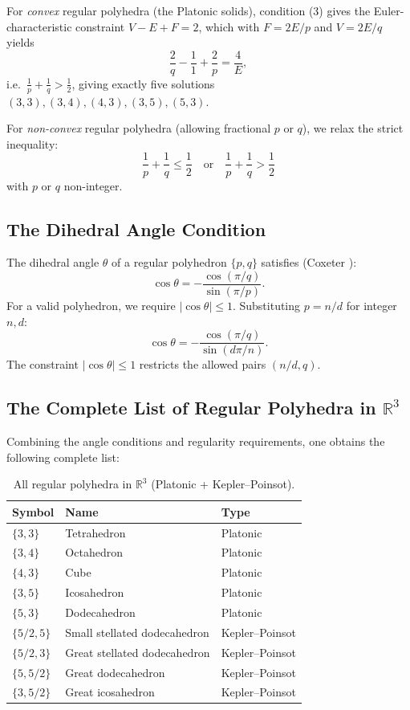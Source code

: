 For \emph{convex} regular polyhedra (the Platonic solids),
condition (3) gives the Euler-characteristic constraint
\(V - E + F = 2\), which with $F = 2E/p$ and $V = 2E/q$
yields
\[
  \frac{2}{q} - \frac{1}{1} + \frac{2}{p} = \frac{4}{E},
\]
i.e.\ $\frac{1}{p} + \frac{1}{q} > \frac{1}{2}$, giving
exactly five solutions $(3,3),(3,4),(4,3),(3,5),(5,3)$.

For \emph{non-convex} regular polyhedra (allowing fractional
$p$ or $q$), we relax the strict inequality:
\[
  \frac{1}{p} + \frac{1}{q} \leq \frac{1}{2}
  \quad \text{or} \quad
  \frac{1}{p} + \frac{1}{q} > \frac{1}{2}
\]
with $p$ or $q$ non-integer.

\subsection{The Dihedral Angle Condition}
\label{ssec:dihedral}

The dihedral angle $\theta$ of a regular polyhedron $\{p,q\}$
satisfies (Coxeter \cite{coxeter_regular_polytopes}):
\[
  \cos\theta = -\frac{\cos(\pi/q)}{\sin(\pi/p)}.
\]
For a valid polyhedron, we require $|\cos\theta| \leq 1$.
Substituting $p = n/d$ for integer $n,d$:
\[
  \cos\theta = -\frac{\cos(\pi/q)}{\sin(d\pi/n)}.
\]
The constraint $|\cos\theta| \leq 1$ restricts the allowed
pairs $(n/d, q)$.

\subsection{The Complete List of Regular Polyhedra in \texorpdfstring{$\mathbb{R}^3$}{R3}}
\label{ssec:complete-list}

Combining the angle conditions and regularity requirements, one
obtains the following complete list:

\begin{table}[h]
\centering
\caption{All regular polyhedra in $\mathbb{R}^3$ (Platonic + Kepler–Poinsot).}
\label{tab:all-regular}
\begin{tabular}{lll}
\hline
Symbol & Name & Type \\
\hline
$\{3,3\}$ & Tetrahedron & Platonic \\
$\{3,4\}$ & Octahedron  & Platonic \\
$\{4,3\}$ & Cube        & Platonic \\
$\{3,5\}$ & Icosahedron & Platonic \\
$\{5,3\}$ & Dodecahedron & Platonic \\
$\{5/2,5\}$ & Small stellated dodecahedron & Kepler–Poinsot \\
$\{5/2,3\}$ & Great stellated dodecahedron & Kepler–Poinsot \\
$\{5,5/2\}$ & Great dodecahedron           & Kepler–Poinsot \\
$\{3,5/2\}$ & Great icosahedron            & Kepler–Poinsot \\
\hline
\end{tabular}
\end{table}

